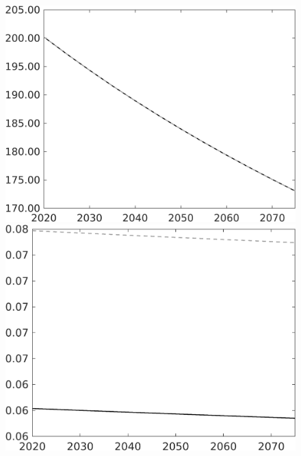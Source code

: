 \begin{figure}[h!!]
\begin{minipage}[]{0.32\textwidth}
\end{minipage}
\begin{minipage}[]{0.32\textwidth}
\includegraphics[width=1\textwidth]{../../codding_model/own_basedOnFried/optimalPol_010922_revision/figures/all_13Sept22/PerdifNoTauf_regime5_CompTaul_GFF_spillover0_nsk0_xgr0_knspil0_sep0_LFlimit0_emsbase0_countec0_GovRev0_etaa0.79_lgd0.png}
\end{minipage}
\begin{minipage}[]{0.32\textwidth}
\includegraphics[width=1\textwidth]{../../codding_model/own_basedOnFried/optimalPol_010922_revision/figures/all_13Sept22/PerdifNoTauf_regime5_CompTaul_hhhl_spillover0_nsk0_xgr0_knspil0_sep0_LFlimit0_emsbase0_countec0_GovRev0_etaa0.79_lgd0.png}

\end{minipage}
\end{figure}
